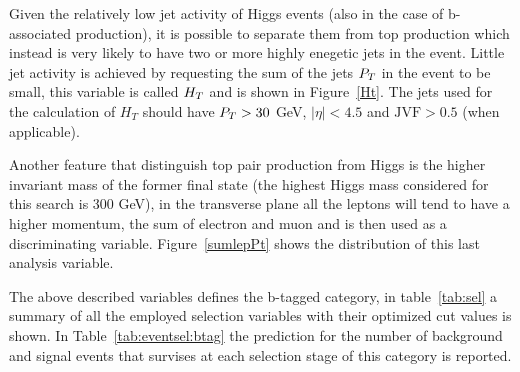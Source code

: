 Given the relatively low jet activity of Higgs events (also in the case of b-associated production), 
it is possible to separate them from
top production which instead is very likely to have two or more highly enegetic jets in the event.
Little jet activity is achieved by requesting the sum of the jets $P_{T}$ in the event to be small, this variable is called $H_{T}$
and is shown in Figure~\ref{Ht}. The jets used for the calculation of $H_T$ should have $P_{T} > 30 $ GeV, $|\eta| < 4.5$  and
$\text{JVF} > 0.5 $ (when applicable).

Another feature that distinguish top pair production from Higgs is the higher invariant mass of the former final state
(the highest Higgs mass considered for this search is 300 GeV),
in the transverse plane all the leptons will tend to have a higher momentum, the sum of electron and muon \pt and \met is then used as
a discriminating variable. Figure~\ref{sumlepPt} shows the distribution of this last analysis variable.

The above described variables defines the b-tagged category, in table~\ref{tab:sel} a summary of all the employed selection 
variables with their optimized cut values is shown. In Table~\ref{tab:eventsel:btag}
the prediction for the number of background and signal events that survises at 
each selection stage of this category is reported.



